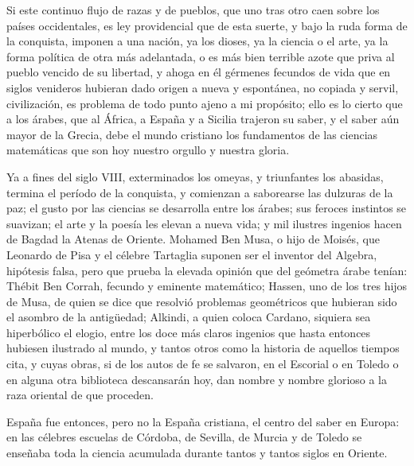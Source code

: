 \documentclass[a4paper, 12pt]{article}
\begin{document}
Si este continuo flujo de razas y de pueblos, que uno tras otro caen sobre los países occidentales, es ley providencial que de esta suerte, y bajo la ruda forma de la conquista, imponen a una nación, ya los dioses, ya la ciencia o el arte, ya la forma política de otra más adelantada, o es más bien terrible azote que priva al pueblo vencido de su libertad, y ahoga en él gérmenes fecundos de vida que en siglos venideros hubieran dado origen a nueva y espontánea, no copiada y servil, civilización, es problema de todo punto ajeno a mi propósito; ello es lo cierto que a los árabes, que al África, a España y a Sicilia trajeron su saber, y el saber aún mayor de la Grecia, debe el mundo cristiano los fundamentos de las ciencias matemáticas que son hoy nuestro orgullo y nuestra gloria.

Ya a fines del siglo VIII, exterminados los omeyas, y triunfantes los abasidas, termina el período de la conquista, y comienzan a saborearse las dulzuras de la paz; el gusto por las ciencias se desarrolla entre los árabes; sus feroces instintos se suavizan; el arte y la poesía les elevan a nueva vida; y mil ilustres ingenios hacen de Bagdad la Atenas de Oriente.  Mohamed Ben Musa, o hijo de Moisés, que Leonardo de Pisa y el célebre Tartaglia suponen ser el inventor del Algebra, hipótesis falsa, pero que prueba la elevada opinión que del geómetra árabe tenían: Thébit Ben Corrah, fecundo y eminente matemático; Hassen, uno de los tres hijos de Musa, de quien se dice que resolvió problemas geométricos que hubieran sido el asombro de la antigüedad; Alkindi, a quien coloca Cardano, siquiera sea hiperbólico el elogio, entre los doce más claros ingenios que hasta entonces hubiesen ilustrado al mundo, y tantos otros como la historia de aquellos tiempos cita, y cuyas obras, si de los autos de fe se salvaron, en el Escorial o en Toledo o en alguna otra biblioteca descansarán hoy, dan nombre y nombre glorioso a la raza oriental de que proceden.

España fue entonces, pero no la España cristiana, el centro del saber en Europa: en las célebres escuelas de Córdoba, de Sevilla, de Murcia y de Toledo se enseñaba toda la ciencia acumulada durante tantos y tantos siglos en Oriente.
\end{document}

